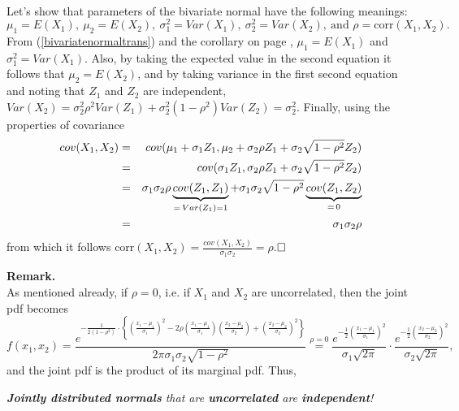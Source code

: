 \documentclass[12pt]{article}
\begin{document}
\\
\noindent Let's show that parameters of the bivariate normal have the following meanings:
$$\mu_1=E(X_1),\ \mu_2=E(X_2),\ \sigma_1^2=Var(X_1),\ \sigma_2^2=Var(X_2),\ \mbox{and }\rho=\mbox{corr}(X_1,X_2).$$
From (\ref{bivariatenormaltrans}) and the corollary on page \pageref{normalcor}, $\mu_1=E(X_1)$ and $\sigma_1^2=Var(X_1)$.  Also, by taking the expected value in the second equation it follows that $\mu_2=E(X_2)$, and by taking variance in the first second equation and noting that $Z_1$ and $Z_2$ are independent,
$Var(X_2) = \sigma_2^2\rho^2Var(Z_1) + \sigma_2^2(1-\rho^2)Var(Z_2) = \sigma_2^2.$
Finally, using the properties of covariance
\begin{eqnarray*}
cov(X_1,X_2) & = & cov(\mu_1 + \sigma_1Z_1,\mu_2 + \sigma_2\rho Z_1 + \sigma_2\sqrt{1-\rho^2}Z_2)\\
&=& cov(\sigma_1Z_1,\sigma_2\rho Z_1 + \sigma_2\sqrt{1-\rho^2}Z_2)\\
&=& \sigma_1\sigma_2\rho \underbrace{cov(Z_1,Z_1)}_{\tiny =\,Var(Z_1)=1} + \sigma_1\sigma_2\sqrt{1-\rho^2} \underbrace{cov(Z_1,Z_2)}_{\tiny =\,0}\\
&=&\sigma_1\sigma_2\rho\\
\end{eqnarray*}
from which it follows $\mbox{corr}(X_1,X_2)=\frac{cov(X_1,X_2)}{\sigma_1\sigma_2}=\rho$.$\hfill\Box$\\



\newpage



\noindent \textbf{Remark.} \\
As mentioned already, if $\rho = 0$, i.e. if $X_1$ and $X_2$ are uncorrelated, then the joint pdf becomes
\begin{equation*}
    f(x_1, x_2) = \frac{e^{-\frac{1}{2(1-\rho^2)} \cdot \left\{\left(\frac{x_1 - \mu_1}{\sigma_1}\right)^2 - 2 \rho\left(\frac{x_1 - \mu_1}{\sigma_1}\right) \! \left(\frac{x_2 - \mu_2}{\sigma_2}\right) + \left(\frac{x_2 - \mu_2}{\sigma_2}\right)^2\right\}}}{2\pi \sigma_1 \sigma_2 \sqrt{1 - \rho^2}}
\stackrel{\rho=0}{=}\frac{e^{-\frac{1}{2}\left(\frac{x_1 - \mu_1}{\sigma_1}\right)^2}}{\sigma_1\sqrt{2\pi}} \cdot \frac{e^{-\frac{1}{2}\left(\frac{x_2 - \mu_2}{\sigma_2}\right)^2}}{\sigma_2 \sqrt{2\pi}},
\end{equation*}
and the joint pdf is the product of its marginal pdf. Thus,\\
\begin{center}
{\em \textbf{Jointly distributed normals} that are \textbf{uncorrelated} are \textbf{independent}!}
\end{center}
\end{document}
